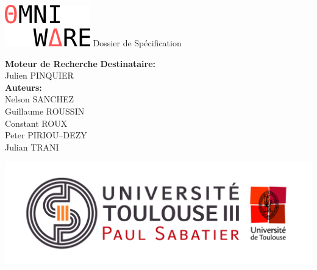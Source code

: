 \documentclass[../main.tex]{subfiles}
\begin{document}
    \begin{titlepage}
        \begin{center}
            \includegraphics[scale=1]{./assets/img/logo_omniware.png}
            \vfill
            \Huge
            Dossier de Spécification

            \HUGE
            \textbf{Moteur de Recherche}
            \vfill
            \normalsize
            \textbf{Destinataire: }\\ 
            Julien PINQUIER\\
            \vspace{1cm}
            \textbf{Auteurs: }\\ 
            Nelson SANCHEZ\\ 
            Guillaume ROUSSIN\\ 
            Constant ROUX\\ 
            Peter PIRIOU--DEZY\\
            Julian TRANI\par
            \vfill
            \includegraphics[scale=0.5]{./assets/img/logo_ut3.jpg}
        \end{center}
    \end{titlepage}
    \begin{titlepage}
    \end{titlepage}
\end{document}
